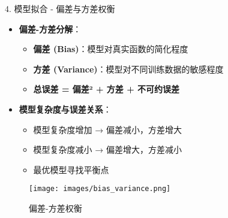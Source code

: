 \documentclass[
  ignorenonframetext,
  aspectratio=169,
  chinese-hans,
]{beamer}
\providecommand{\tightlist}{%
  \setlength{\itemsep}{0pt}\setlength{\parskip}{0pt}}\usepackage{longtable,booktabs,array}
\begin{document}
\begin{frame}{4. 模型拟合 - 偏差与方差权衡}
\label{ux6a21ux578bux62dfux5408---ux504fux5deeux4e0eux65b9ux5deeux6743ux8861}
\begin{itemize}
\tightlist
\item
  \textbf{偏差-方差分解}：

  \begin{itemize}
  \tightlist
  \item
    \textbf{偏差 (Bias)}：模型对真实函数的简化程度
  \item
    \textbf{方差 (Variance)}：模型对不同训练数据的敏感程度
  \item
    \textbf{总误差 = 偏差² + 方差 + 不可约误差}
  \end{itemize}
\item
  \textbf{模型复杂度与误差关系}：

  \begin{itemize}
  \tightlist
  \item
    模型复杂度增加 → 偏差减小，方差增大
  \item
    模型复杂度减小 → 偏差增大，方差减小
  \item
    最优模型寻找平衡点
  \end{itemize}
\end{itemize}

\begin{figure}[H]

{\centering \texttt{[image: images/bias\_variance.png]}

}

\caption{偏差-方差权衡}

\end{figure}%
\end{frame}
\end{document}
